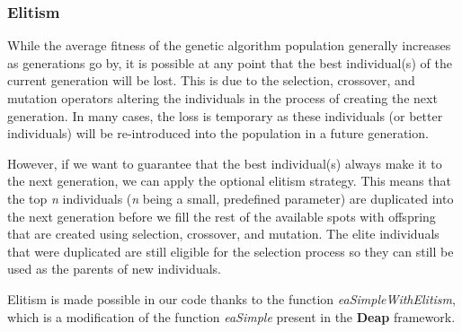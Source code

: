 \subsubsection{Elitism}
While the average fitness of the genetic algorithm population generally increases as generations go by, it is possible at any point that the best individual(s) of the current generation will be lost. This is due to the selection, crossover, and mutation operators altering the individuals in the process of creating the next generation. In many cases, the loss is temporary as these individuals (or better individuals) will be re-introduced into the population in a future generation.

However, if we want to guarantee that the best individual(s) always make it to the next generation, we can apply the optional elitism strategy. This means that the top \textit{n} individuals (\textit{n} being a small, predefined parameter) are duplicated into the next generation before we fill the rest of the available spots with offspring that are created using selection, crossover, and mutation. The elite individuals that were duplicated are still eligible for the selection process so they can still be used as the parents of new individuals.

Elitism is made possible in our code thanks to the function \textit{eaSimpleWithElitism}, which is a modification of the function \textit{eaSimple} present in the \textbf{Deap} framework.
